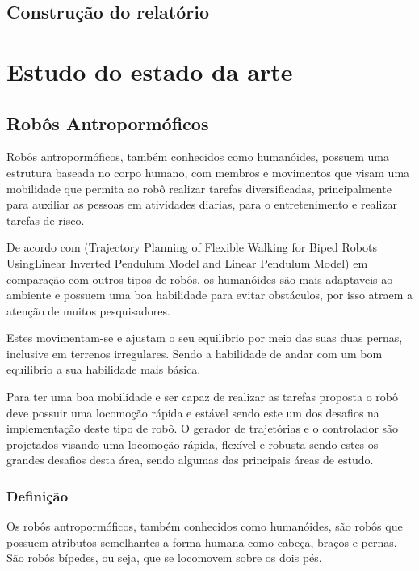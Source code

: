 \section{Construção do relatório}
\label{sec:const}


\chapter{Estudo do estado da arte}
\label{chap:sota}

\section{Robôs Antropormóficos}
\label{ssec:robos}

Robôs antropormóficos, também conhecidos como humanóides, possuem uma estrutura baseada no corpo humano, com  membros e movimentos que visam uma mobilidade que permita ao robô realizar tarefas diversificadas, principalmente para auxiliar as pessoas em atividades diarias, para o entretenimento e realizar tarefas de risco.

De acordo com (Trajectory Planning of Flexible Walking for Biped Robots UsingLinear Inverted Pendulum Model and Linear Pendulum Model) em comparação com outros tipos de robôs, os humanóides são mais adaptaveis ao ambiente e possuem uma boa habilidade para evitar obstáculos, por isso atraem a atenção de muitos pesquisadores.

Estes movimentam-se e ajustam o seu equilibrio por meio das suas duas pernas, inclusive em terrenos irregulares. Sendo a habilidade de andar com um bom equilibrio a sua habilidade mais básica.

Para ter uma boa mobilidade e ser capaz de realizar as tarefas proposta o robô deve possuir uma locomoção rápida e estável sendo este um dos desafios na implementação deste tipo de robô. O gerador de trajetórias e o controlador são projetados visando uma locomoção rápida, flexível e robusta sendo estes os grandes desafios desta área, sendo algumas das principais áreas de estudo.

\subsection{Definição}
\label{ssec:defi}

Os robôs antropormóficos, também conhecidos como humanóides, são robôs que possuem atributos semelhantes a forma humana como cabeça, braços e pernas. São robôs bípedes, ou seja, que se locomovem sobre os dois pés.

